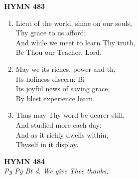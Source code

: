 \documentclass[11pt,a4paper]{article}
\begin{document}
\newpage
\begin{center}
    {\Large \textbf{HYMN 483}}
\end{center}
\vspace{1em}

\begin{enumerate}
    \item Licut of the world, shine on our souls, \\
        Thy grace to us afford; \\
        And while we meet to learn Thy truth, \\
        Be Thou our Teacher, Lord.

    \item May we its riches, power and th, \\
        Its holiness discern; Bi \\
        Its joyful news of saving grace, \\
        By blest experience learn.

    \item Thus may Thy word be dearer still, \\
        And studied more each day; \\
        And as it richly dwells within, \\
        Thyself in it display.

\end{enumerate}

\newpage
\begin{center}
    {\Large \textbf{HYMN 484}}
    \\
    \textit{Py Py Bt d. We give Thee thanks,}
\end{center}
\vspace{1em}
\end{document}
